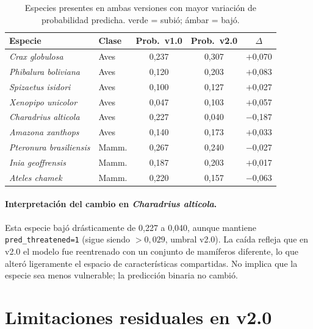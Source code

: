 \documentclass[12pt,a4paper]{article}
\newcommand{\celplus}[1]{\cellcolor{verdeClaro}#1}   %
\newcommand{\celneutro}[1]{\cellcolor{ambarClaro}#1} %
\begin{document}
\begin{table}[H]
  \centering\small
  \caption{Especies presentes en ambas versiones con mayor variación de probabilidad predicha.
           \colorbox{verdeClaro}{\footnotesize verde} = subió;
           \colorbox{ambarClaro}{\footnotesize ámbar} = bajó.}
  \label{tab:prob_cambios}
  \begin{tabular}{p{4.8cm}lccc}
    \toprule
    \textbf{Especie} & \textbf{Clase} & \textbf{Prob.\ v1.0} & \textbf{Prob.\ v2.0} & $\Delta$ \\
    \midrule
    \textit{Crax globulosa}        & Aves & 0,237 & \celplus{0,307} & $+$0,070 \\
    \textit{Phibalura boliviana}   & Aves & 0,120 & \celplus{0,203} & $+$0,083 \\
    \textit{Spizaetus isidori}     & Aves & 0,100 & \celplus{0,127} & $+$0,027 \\
    \textit{Xenopipo unicolor}     & Aves & 0,047 & \celplus{0,103} & $+$0,057 \\
    \midrule
    \textit{Charadrius alticola}   & Aves & 0,227 & \celneutro{0,040} & $-$0,187 \\
    \textit{Amazona xanthops}      & Aves & 0,140 & \celneutro{0,173} & $+$0,033 \\
    \textit{Pteronura brasiliensis}& Mamm.& 0,267 & \celneutro{0,240} & $-$0,027 \\
    \textit{Inia geoffrensis}      & Mamm.& 0,187 & \celneutro{0,203} & $+$0,017 \\
    \textit{Ateles chamek}         & Mamm.& 0,220 & \celneutro{0,157} & $-$0,063 \\
    \bottomrule
  \end{tabular}
\end{table}

\paragraph{Interpretación del cambio en \textit{Charadrius alticola}.}
Esta especie bajó drásticamente de 0,227 a 0,040, aunque mantiene \texttt{pred\_threatened=1}
(sigue siendo $> 0{,}029$, umbral v2.0).  La caída refleja que en v2.0 el modelo fue
reentrenado con un conjunto de mamíferos diferente, lo que alteró ligeramente el espacio de
características compartidas.  No implica que la especie sea menos vulnerable; la predicción
binaria no cambió.

\section{Limitaciones residuales en v2.0}
\end{document}
